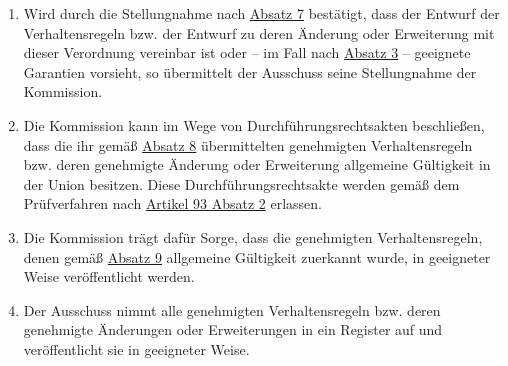 \begin{enumerate}
  \item Wird durch die Stellungnahme nach \hyperref[itm:40-3]{Absatz 7} bestätigt, dass der Entwurf der Verhaltensregeln
   bzw. der Entwurf zu deren Änderung oder Erweiterung mit dieser Verordnung vereinbar ist oder -- im Fall
   nach \hyperref[itm:40-3]{Absatz 3} -- geeignete Garantien vorsieht, so übermittelt der Ausschuss seine Stellungnahme
   der Kommission.%
  \label{itm:40-8}

  \item Die Kommission kann im Wege von Durchführungsrechtsakten beschließen, dass die ihr gemäß \hyperref[itm:40-8]
   {Absatz 8} übermittelten genehmigten Verhaltensregeln bzw. deren genehmigte Änderung oder Erweiterung allgemeine
   Gültigkeit in der Union besitzen. Diese Durchführungsrechtsakte werden gemäß dem Prüfverfahren nach \hyperref
   [itm:93-2]{Artikel 93 Absatz 2} erlassen.%
  \label{itm:40-9}

  \item Die Kommission trägt dafür Sorge, dass die genehmigten Verhaltensregeln, denen gemäß \hyperref[itm:40-9]
   {Absatz 9} allgemeine Gültigkeit zuerkannt wurde, in geeigneter Weise veröffentlicht werden.%
  \label{itm:40-10}

  \item Der Ausschuss nimmt alle genehmigten Verhaltensregeln bzw. deren genehmigte Änderungen oder Erweiterungen in ein
   Register auf und veröffentlicht sie in geeigneter Weise.%
  \label{itm:40-11}

\end{enumerate}


